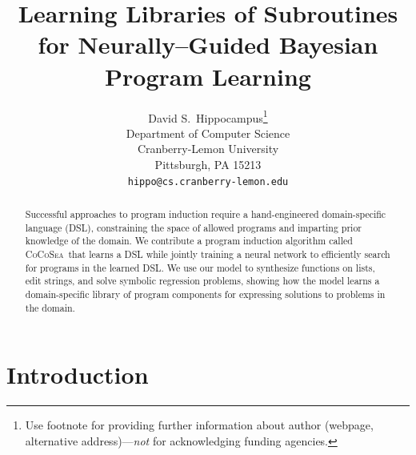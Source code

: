 \documentclass{article}
\title{Learning Libraries of Subroutines for Neurally--Guided Bayesian Program Learning}
\author{
  David S.~Hippocampus\thanks{Use footnote for providing further
    information about author (webpage, alternative
    address)---\emph{not} for acknowledging funding agencies.} \\
  Department of Computer Science\\
  Cranberry-Lemon University\\
  Pittsburgh, PA 15213 \\
  \texttt{hippo@cs.cranberry-lemon.edu} \\
}
\newcommand{\system}{\textsc{CoCoSea}~}
\begin{document}

\maketitle

\begin{abstract}
  Successful approaches to program induction require a hand-engineered
  domain-specific language (DSL), constraining the space of allowed
  programs and imparting prior knowledge of the domain.  We contribute
  a program induction algorithm called \system that learns a DSL while
  jointly training a neural network to efficiently search for programs
  in the learned DSL.  We use our model to synthesize functions on lists,
  edit strings, and solve symbolic regression problems, showing how the
  model learns a domain-specific library of program components for
  expressing solutions to problems in the domain.
\end{abstract}


\section{Introduction}
\end{document}
